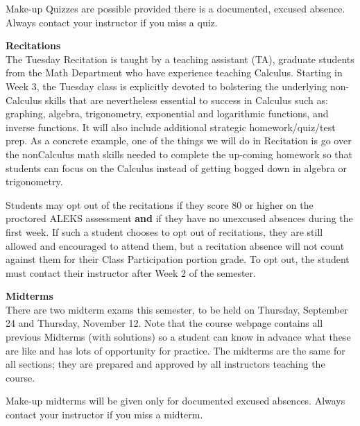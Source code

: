 \documentclass[12pt]{article}
\renewcommand{\emph}[1]{\textsf{\textbf{#1}}}
\newcommand{\localhead}[1]{\par\smallskip\textbf{#1}\nobreak\\}%
\def\heading#1{\localhead{\large\emph{#1}}}
\begin{document}
Make-up Quizzes are possible provided there is a documented, excused absence. Always contact your instructor if you miss a quiz.




\heading{Recitations}
The Tuesday Recitation is taught by a teaching assistant (TA), graduate students from the Math  Department who have experience teaching Calculus. Starting in Week 3, the Tuesday class is explicitly devoted to bolstering the underlying non-Calculus skills that are nevertheless essential to success in Calculus such as: graphing, algebra, trigonometry, exponential and logarithmic functions, and inverse functions. It will also include additional strategic homework/quiz/test prep. As a concrete example, one of the things we will do in Recitation is go over the nonCalculus math skills needed to complete the up-coming homework so that students can focus on the Calculus instead of getting bogged down in algebra or trigonometry.

Students may opt out of the recitations if they score 80 or higher on the proctored ALEKS assessment \textbf{and} if they have no unexcused absences during the first week. If such a student chooses to opt out of recitations, they are still allowed and encouraged to attend them, but a recitation absence will not count against them for their Class Participation portion grade. To opt out, the student must contact their instructor after Week 2 of the semester.

\heading{Midterms}
There are two midterm exams this semester, to be held on Thursday, September 24 and Thursday, November 12. Note that the course webpage contains all previous Midterms (with solutions) so a student can know in advance what these are like and has lots of opportunity for practice. The midterms are the same 
for all sections; they are prepared and approved by all instructors teaching the course. 

Make-up midterms will be given only for documented excused absences. Always contact your instructor if you miss a midterm.
\end{document}
